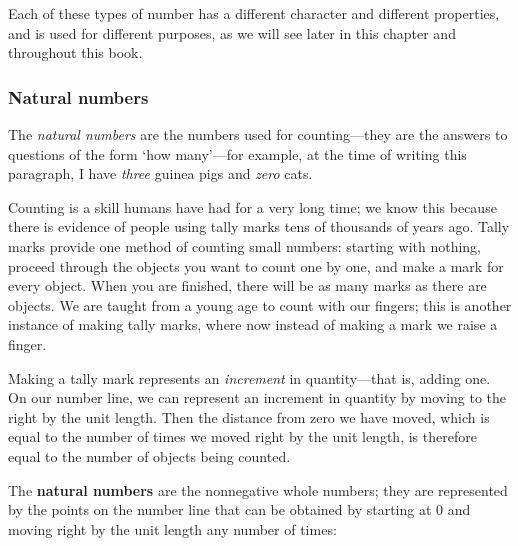 Each of these types of number has a different character and different properties, and is used for different purposes, as we will see later in this chapter and throughout this book.

\subsubsection*{Natural numbers}

The \textit{natural numbers} are the numbers used for counting---they are the answers to questions of the form `how many'---for example, at the time of writing this paragraph, I have \textit{three} guinea pigs
and \textit{zero} cats.

Counting is a skill humans have had for a very long time; we know this because there is evidence of people using tally marks tens of thousands of years ago. Tally marks provide one method of counting small numbers: starting with nothing, proceed through the objects you want to count one by one, and make a mark for every object. When you are finished, there will be as many marks as there are objects. We are taught from a young age to count with our fingers; this is another instance of making tally marks, where now instead of making a mark we raise a finger.

Making a tally mark represents an \textit{increment} in quantity---that is, adding one. On our number line, we can represent an increment in quantity by moving to the right by the unit length. Then the distance from zero we have moved, which is equal to the number of times we moved right by the unit length, is therefore equal to the number of objects being counted.

\begin{definition}
\label{defNaturalNumberInformal}
The \textbf{natural numbers} are the nonnegative whole numbers; they are represented by the points on the number line that can be obtained by starting at $0$ and moving right by the unit length any number of times:
\begin{center}
\end{center}
~
\end{definition}

